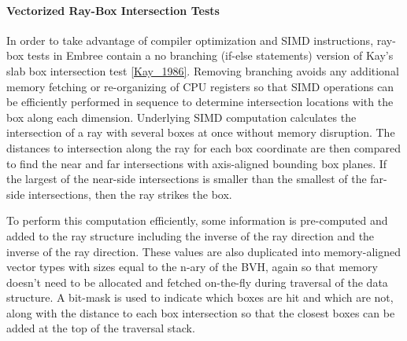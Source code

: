 \paragraph{Vectorized Ray-Box Intersection Tests}

In order to take advantage of compiler optimization and SIMD instructions,
ray-box tests in Embree contain a no branching (if-else statements) version of
Kay's slab box intersection test \ref{Kay_1986}. Removing branching avoids any
additional memory fetching or re-organizing of CPU registers so that SIMD
operations can be efficiently performed in sequence to determine intersection
locations with the box along each dimension. Underlying SIMD computation
calculates the intersection of a ray with several boxes at once without memory
disruption. The distances to intersection along the ray for each box coordinate
are then compared to find the near and far intersections with axis-aligned
bounding box planes. If the largest of the near-side intersections is smaller
than the smallest of the far-side intersections, then the ray strikes the box.

To perform this computation efficiently, some information is pre-computed and
added to the ray structure including the inverse of the ray direction and the
inverse of the ray direction. These values are also duplicated into
memory-aligned vector types with sizes equal to the n-ary of the BVH, again so
that memory doesn't need to be allocated and fetched on-the-fly during traversal
of the data structure. A bit-mask is used to indicate which boxes are hit and
which are not, along with the distance to each box intersection so that the
closest boxes can be added at the top of the traversal stack.


